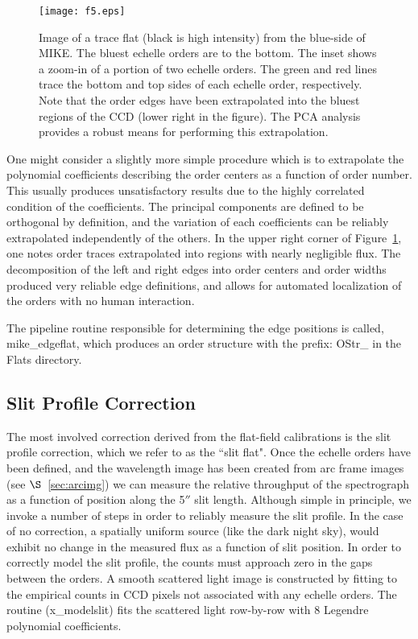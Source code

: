 \documentclass[]{emulateapj}
\begin{document}
\begin{figure}
\texttt{[image: f5.eps]}
\caption{Image of a trace flat (black is high intensity) from the blue-side
of MIKE.  The bluest echelle orders are to the bottom.  The inset shows
a zoom-in of a portion of two echelle orders.  The green and red lines
trace the bottom and top sides of each echelle order, respectively.  Note that
the order edges have been extrapolated into the bluest regions of the
CCD (lower right in the figure).  
The PCA analysis provides a robust means for performing
this extrapolation.}
\label{fig:trace}
\end{figure}

One might consider a slightly more simple procedure which is to 
extrapolate the polynomial coefficients describing the order centers 
as a function of order number.  
This usually produces unsatisfactory results due to the highly
correlated condition of the coefficients.  The principal components are
defined to be orthogonal by definition, and the variation of each 
coefficients can be reliably extrapolated independently of the others.
In the upper right corner of Figure~\ref{fig:trace}, one notes 
order traces extrapolated into regions with nearly negligible flux.
The decomposition of the left and right edges into order centers and
order widths produced very reliable edge definitions, and 
allows for automated localization of the 
orders with no human interaction.

The pipeline routine responsible for determining the edge positions
is called, mike\_edgeflat, which produces an order structure with the
prefix:  OStr\_ in the Flats directory.

\subsection{Slit Profile Correction}
\label{sec:slitprof}

The most involved correction derived from the
flat-field calibrations is the slit profile correction, which we refer
to as the ``slit flat".  Once the echelle orders have been defined, and the
wavelength image has been created from arc frame images 
(see $\S$~\ref{sec:arcimg})
we can measure the relative throughput of the spectrograph as a function of
position along the 5$''$ slit length.  
Although simple in principle, we invoke a number
of steps in order to reliably measure the slit profile.  In the case of no
correction, a spatially uniform source (like the dark night sky), would
exhibit no change in the measured flux as a function of slit position.
In order to correctly model the slit profile, the counts must approach zero
in the gaps between the orders.  A smooth scattered light image is constructed 
by fitting to the empirical counts in CCD pixels not associated with any
echelle orders.  The routine (x\_modelslit)
fits the scattered light row-by-row with 
8 Legendre polynomial coefficients. 
\end{document}
